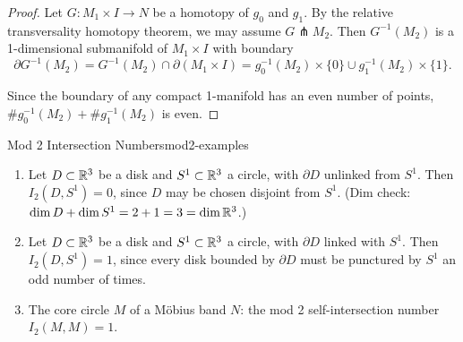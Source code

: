 \begin{proof}
    Let $G \colon M_1 \times I \to N$ be a homotopy of $g_0$ and $g_1$. By the relative transversality homotopy theorem, we may assume $G \pitchfork M_2$. Then $G^{-1}(M_2)$ is a 1-dimensional submanifold of $M_1 \times I$ with boundary
    \[
        \partial G^{-1}(M_2) = G^{-1}(M_2) \cap \partial(M_1 \times I) = g_0^{-1}(M_2) \times \{0\} \cup g_1^{-1}(M_2) \times \{1\}.
    \]
    \begin{center}
    \end{center}
    Since the boundary of any compact 1-manifold has an even number of points, $\# g_0^{-1}(M_2) + \# g_1^{-1}(M_2)$ is even.
\end{proof}

\begin{example}{Mod 2 Intersection Numbers}{mod2-examples}
    \begin{enumerate}
        \item Let $D \subset \mathbb{R}^3$ be a disk and $S^1 \subset \mathbb{R}^3$ a circle, with $\partial D$ unlinked from $S^1$. Then $I_2(D, S^1) = 0$, since $D$ may be chosen disjoint from $S^1$. (Dim check: $\dim D + \dim S^1 = 2 + 1 = 3 = \dim \mathbb{R}^3$.)
        \item Let $D \subset \mathbb{R}^3$ be a disk and $S^1 \subset \mathbb{R}^3$ a circle, with $\partial D$ linked with $S^1$. Then $I_2(D, S^1) = 1$, since every disk bounded by $\partial D$ must be punctured by $S^1$ an odd number of times.
        \item The core circle $M$ of a M\"obius band $N$: the mod 2 self-intersection number $I_2(M, M) = 1$.
    \end{enumerate}
\end{example}


